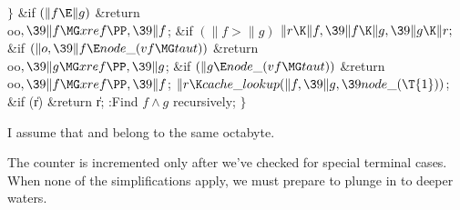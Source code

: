 \4${}\}{}$\2\6
\&{if} ${}(\|f\E\|g){}$\1\5
\&{return} \\{oo}${},\39\|f\MG\\{xref}\PP,\39\|f{}$;\2\6
\&{if} ${}(\|f>\|g){}$\1\5
${}\|r\K\|f,\39\|f\K\|g,\39\|g\K\|r;{}$\2\6
\&{if} ${}(\|o,\39\|f\E\\{node\_}(\\{vf}\MG\\{taut})){}$\1\5
\&{return} \\{oo}${},\39\|g\MG\\{xref}\PP,\39\|g{}$;\2\6
\&{if} ${}(\|g\E\\{node\_}(\\{vf}\MG\\{taut})){}$\1\5
\&{return} \\{oo}${},\39\|f\MG\\{xref}\PP,\39\|f{}$;\2\6
${}\|r\K\\{cache\_lookup}(\|f,\39\|g,\39\\{node\_}(\T{1})){}$;\6
\&{if} (\|r)\1\5
\&{return} \|r;\2\6
:Find $f\land g$ recursively\X;\6
\4${}\}{}$\2\par
\fi

I assume that  and  belong to the
same octabyte.

The  counter is incremented only after we've checked for
special terminal cases. When none of the simplifications apply,
we must prepare to plunge in to deeper waters.

